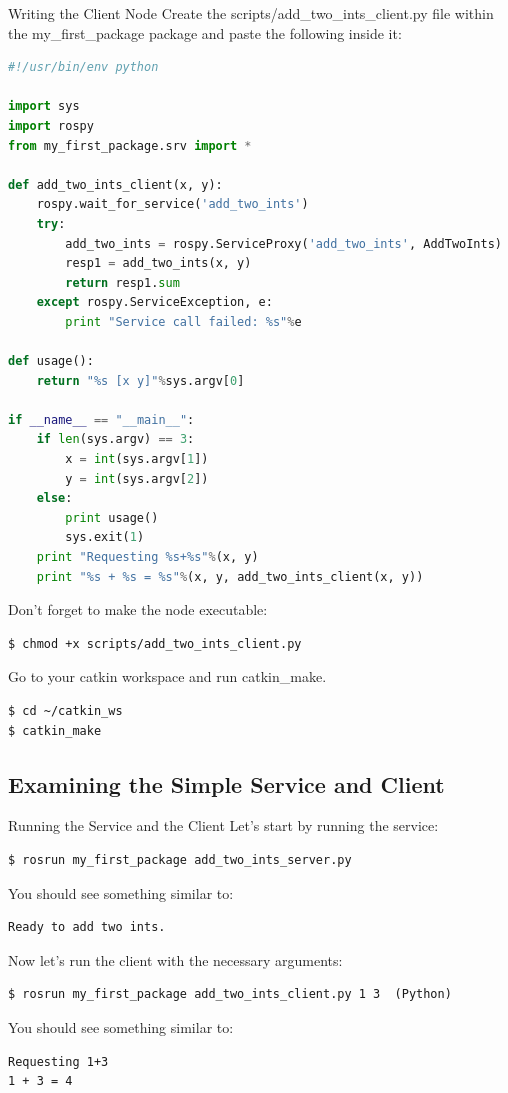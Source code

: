 \begin{frame}{Writing the Client Node}
Create the scripts/add\_two\_ints\_client.py file within the my\_first\_package package and paste the following inside it:

\begin{lstlisting}[language=python]
#!/usr/bin/env python

import sys
import rospy
from my_first_package.srv import *

def add_two_ints_client(x, y):
    rospy.wait_for_service('add_two_ints')
    try:
        add_two_ints = rospy.ServiceProxy('add_two_ints', AddTwoInts)
        resp1 = add_two_ints(x, y)
        return resp1.sum
    except rospy.ServiceException, e:
        print "Service call failed: %s"%e

def usage():
    return "%s [x y]"%sys.argv[0]

if __name__ == "__main__":
    if len(sys.argv) == 3:
        x = int(sys.argv[1])
        y = int(sys.argv[2])
    else:
        print usage()
        sys.exit(1)
    print "Requesting %s+%s"%(x, y)
    print "%s + %s = %s"%(x, y, add_two_ints_client(x, y))
\end{lstlisting}

Don't forget to make the node executable:
\begin{lstlisting}[language=shell]
$ chmod +x scripts/add_two_ints_client.py

\end{lstlisting}
Go to your catkin workspace and run catkin\_make.
\begin{lstlisting}[language=shell]
$ cd ~/catkin_ws
$ catkin_make
\end{lstlisting}
\end{frame}

\subsection{Examining the Simple Service and Client}

\begin{frame}[fragile]{Running the Service and the Client}
Let's start by running the service:
\begin{lstlisting}[language=shell]
$ rosrun my_first_package add_two_ints_server.py
\end{lstlisting}
You should see something similar to:
\begin{lstlisting}[language=shell]
Ready to add two ints.
\end{lstlisting}

Now let's run the client with the necessary arguments:
\begin{lstlisting}[language=shell]
$ rosrun my_first_package add_two_ints_client.py 1 3  (Python) 
\end{lstlisting}
You should see something similar to:
\begin{lstlisting}[language=shell]
Requesting 1+3
1 + 3 = 4
\end{lstlisting}
\end{frame}

